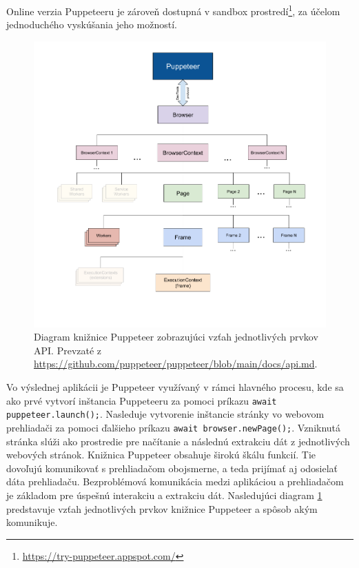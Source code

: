 Online verzia Puppeteeru je zároveň dostupná v sandbox prostredí\footnote{\url{https://try-puppeteer.appspot.com/}}, za účelom jednoduchého vyskúšania jeho možností.

\bigskip

\begin{figure}[hbt]
	\centering
	\includegraphics[width=1\textwidth]{obrazky-figures/diagram.png}
	\caption{Diagram knižnice Puppeteer zobrazujúci vzťah jednotlivých prvkov API. Prevzaté z \url{https://github.com/puppeteer/puppeteer/blob/main/docs/api.md}.}
	\label{diagram}
\end{figure}

Vo výslednej aplikácii je Puppeteer využívaný v rámci hlavného procesu, kde sa ako prvé vytvorí inštancia Puppeteeru za pomoci príkazu \texttt{await puppeteer.launch();}. Nasleduje vytvorenie inštancie stránky vo webovom prehliadači za pomoci ďalšieho príkazu \mbox{\texttt{await browser.newPage();}}. Vzniknutá stránka slúži ako prostredie pre načítanie a následnú extrakciu dát z jednotlivých webových stránok. Knižnica Puppeteer obsahuje širokú škálu funkcií. Tie dovoľujú komunikovať s prehliadačom obojsmerne, a teda prijímať aj odosielať dáta prehliadaču. Bezproblémová komunikácia medzi aplikáciou a prehliadačom je základom pre úspešnú interakciu a extrakciu dát. Nasledujúci diagram \ref{diagram} predstavuje vzťah jednotlivých prvkov knižnice Puppeteer a spôsob akým komunikuje.

